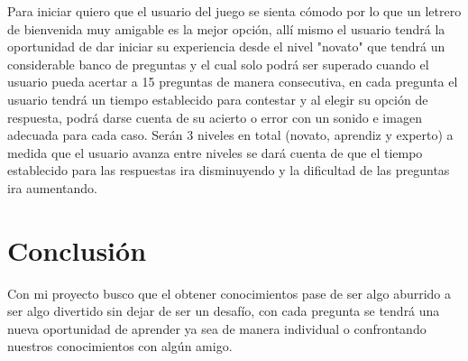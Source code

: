 \documentclass{article}
\begin{document}
Para iniciar quiero que el usuario del juego se sienta cómodo por lo que un letrero de bienvenida muy amigable es la mejor opción, allí mismo el usuario tendrá la oportunidad de dar iniciar  su experiencia  desde el nivel "novato" que tendrá un considerable banco de preguntas y el cual solo podrá ser superado cuando el usuario  pueda acertar a 15 preguntas de manera consecutiva, en cada pregunta el usuario tendrá un tiempo establecido para contestar y al elegir su opción de respuesta, podrá darse cuenta de su acierto o error con un sonido e imagen adecuada para cada caso.  Serán 3 niveles en total (novato, aprendiz y experto) a medida que el usuario avanza entre niveles se dará cuenta de que el tiempo establecido para las respuestas ira disminuyendo y la dificultad de las preguntas ira aumentando.


\newpage
\section{Conclusión}
Con mi proyecto busco que el obtener conocimientos pase de ser algo aburrido a ser algo divertido sin dejar de ser un desafío, con cada pregunta se tendrá una nueva oportunidad de aprender ya sea de manera individual o confrontando nuestros conocimientos con algún amigo.
\end{document}
